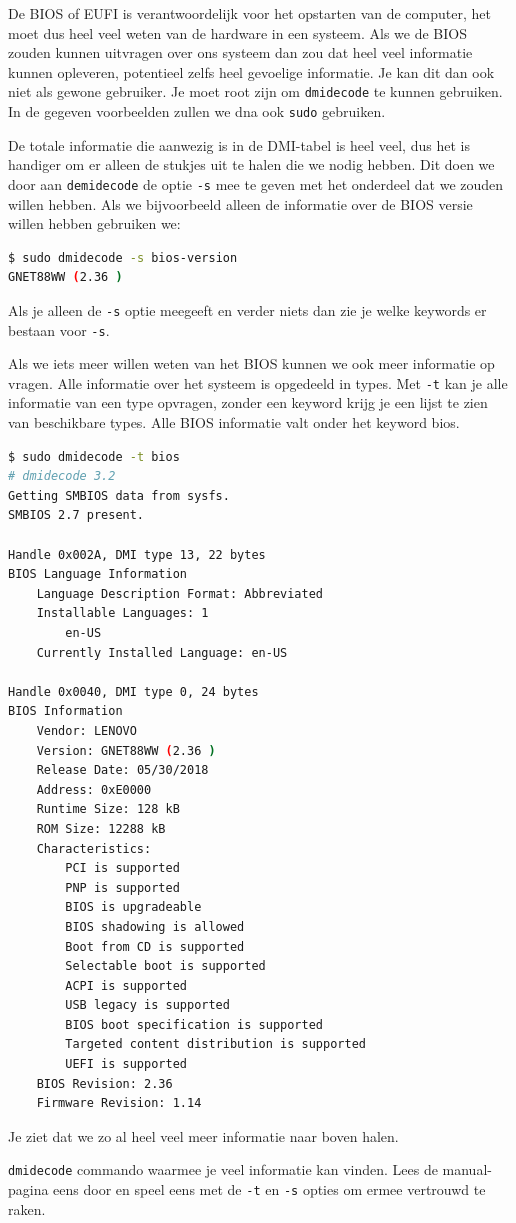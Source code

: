 De BIOS of EUFI is verantwoordelijk voor het opstarten van de computer, het moet dus heel veel weten van de hardware in een systeem. Als we de BIOS zouden kunnen uitvragen over ons systeem dan zou dat heel veel informatie kunnen opleveren, potentieel zelfs heel gevoelige informatie. Je kan dit dan ook niet als gewone gebruiker. Je moet root zijn om \texttt{dmidecode} te kunnen gebruiken. In de gegeven voorbeelden zullen we dna ook \texttt{sudo} gebruiken.

De totale informatie die aanwezig is in de DMI-tabel is heel veel, dus het is handiger om er alleen de stukjes uit te halen die we nodig hebben. Dit doen we door aan \texttt{demidecode} de optie \texttt{-s} mee te geven met het onderdeel dat we zouden willen hebben. Als we bijvoorbeeld alleen de informatie over de BIOS versie willen hebben gebruiken we:
\begin{lstlisting}[language=bash]
$ sudo dmidecode -s bios-version
GNET88WW (2.36 )
\end{lstlisting}
Als je alleen de \texttt{-s} optie meegeeft en verder niets dan zie je welke keywords er bestaan voor \texttt{-s}.

Als we iets meer willen weten van het BIOS kunnen we ook meer informatie op vragen. Alle informatie over het systeem is opgedeeld in types. Met \texttt{-t} kan je alle informatie van een type opvragen, zonder een keyword krijg je een lijst te zien van beschikbare types. Alle BIOS informatie valt onder het keyword bios.
\begin{lstlisting}[language=bash]
$ sudo dmidecode -t bios
# dmidecode 3.2
Getting SMBIOS data from sysfs.
SMBIOS 2.7 present.

Handle 0x002A, DMI type 13, 22 bytes
BIOS Language Information
	Language Description Format: Abbreviated
	Installable Languages: 1
		en-US
	Currently Installed Language: en-US

Handle 0x0040, DMI type 0, 24 bytes
BIOS Information
	Vendor: LENOVO
	Version: GNET88WW (2.36 )
	Release Date: 05/30/2018
	Address: 0xE0000
	Runtime Size: 128 kB
	ROM Size: 12288 kB
	Characteristics:
		PCI is supported
		PNP is supported
		BIOS is upgradeable
		BIOS shadowing is allowed
		Boot from CD is supported
		Selectable boot is supported
		ACPI is supported
		USB legacy is supported
		BIOS boot specification is supported
		Targeted content distribution is supported
		UEFI is supported
	BIOS Revision: 2.36
	Firmware Revision: 1.14
\end{lstlisting}
Je ziet dat we zo al heel veel meer informatie naar boven halen.

\texttt{dmidecode} commando waarmee je veel informatie kan vinden. Lees de manual-pagina eens door en speel eens met de \texttt{-t} en \texttt{-s} opties om ermee vertrouwd te raken.


